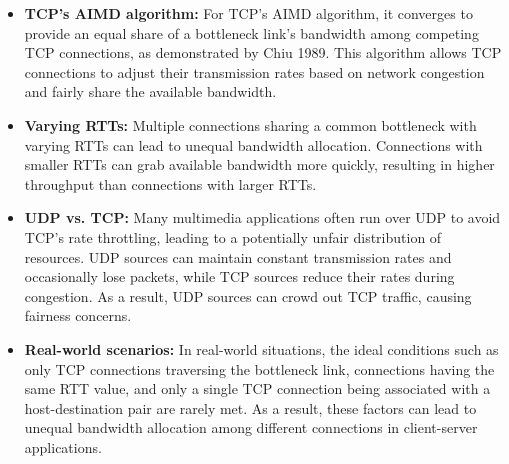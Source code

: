 \begin{itemize}
    \item \textbf{TCP's AIMD algorithm:} For TCP's AIMD algorithm, it converges to provide an equal share of a bottleneck link's bandwidth among competing TCP connections, as demonstrated by Chiu 1989. This algorithm allows TCP connections to adjust their transmission rates based on network congestion and fairly share the available bandwidth.
    
    \item \textbf{Varying RTTs:} Multiple connections sharing a common bottleneck with varying RTTs can lead to unequal bandwidth allocation. Connections with smaller RTTs can grab available bandwidth more quickly, resulting in higher throughput than connections with larger RTTs.
    
    \item \textbf{UDP vs. TCP:} Many multimedia applications often run over UDP to avoid TCP's rate throttling, leading to a potentially unfair distribution of resources. UDP sources can maintain constant transmission rates and occasionally lose packets, while TCP sources reduce their rates during congestion. As a result, UDP sources can crowd out TCP traffic, causing fairness concerns.
    
    \item \textbf{Real-world scenarios:} In real-world situations, the ideal conditions such as only TCP connections traversing the bottleneck link, connections having the same RTT value, and only a single TCP connection being associated with a host-destination pair are rarely met. As a result, these factors can lead to unequal bandwidth allocation among different connections in client-server applications.
\end{itemize}

